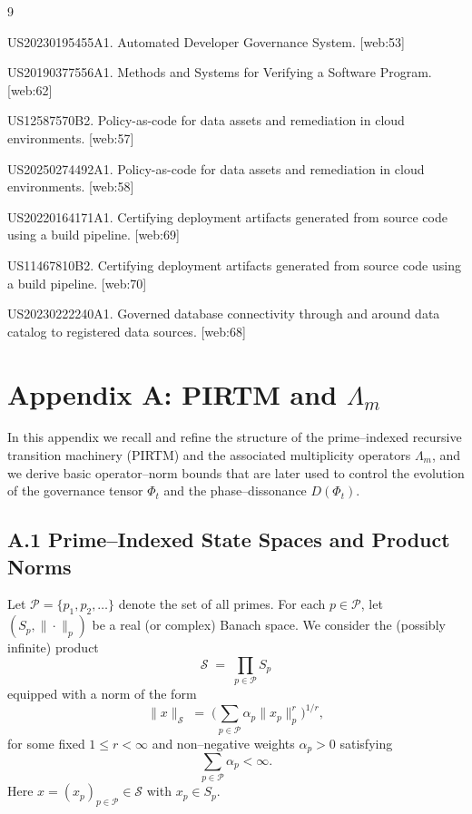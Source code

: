 \documentclass[11pt]{article}
\begin{document}

\begin{thebibliography}{9}

US20230195455A1. Automated Developer Governance System. [web:53]

US20190377556A1. Methods and Systems for Verifying a Software Program. [web:62]

US12587570B2. Policy-as-code for data assets and remediation in cloud environments. [web:57]

US20250274492A1. Policy-as-code for data assets and remediation in cloud environments. [web:58]

US20220164171A1. Certifying deployment artifacts generated from source code using a build pipeline. [web:69]

US11467810B2. Certifying deployment artifacts generated from source code using a build pipeline. [web:70]

US20230222240A1. Governed database connectivity through and around data catalog to registered data sources. [web:68]

\end{thebibliography}
\newpage
\appendix
\section{Appendix A: PIRTM and $\Lambda_m$}

In this appendix we recall and refine the structure of the prime–indexed recursive transition machinery (PIRTM) and the associated multiplicity operators $\Lambda_m$, and we derive basic operator–norm bounds that are later used to control the evolution of the governance tensor $\Phi_t$ and the phase–dissonance $D(\Phi_t)$.

\subsection{A.1 Prime–Indexed State Spaces and Product Norms}

Let $\mathcal{P} = \{p_1,p_2,\dots\}$ denote the set of all primes. For each $p \in \mathcal{P}$, let $(S_p,\|\cdot\|_p)$ be a real (or complex) Banach space. We consider the (possibly infinite) product
\[
  \mathcal{S} \;=\; \prod_{p \in \mathcal{P}} S_p
\]
equipped with a norm of the form
\begin{equation}\label{eq:prod-norm}
  \|x\|_{\mathcal{S}} \;=\;
  \Bigg(
    \sum_{p \in \mathcal{P}} \alpha_p \|x_p\|_p^r
  \Bigg)^{1/r},
\end{equation}
for some fixed $1 \le r < \infty$ and non–negative weights $\alpha_p > 0$ satisfying
\[
  \sum_{p \in \mathcal{P}} \alpha_p < \infty.
\]
Here $x = (x_p)_{p \in \mathcal{P}} \in \mathcal{S}$ with $x_p \in S_p$.
\end{document}

